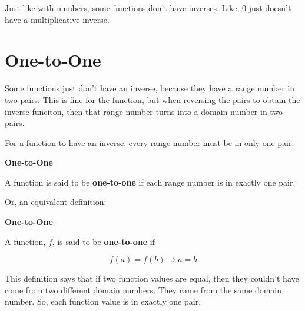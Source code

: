\documentclass{ximera}
\begin{document}
Just like with numbers, some functions don't have inverses.  Like, $0$ just doesn't have a multiplicative inverse.






\section{One-to-One}


Some functions just don't have an inverse, because they have a range number in two pairs.  This is fine for the function, but when reversing the pairs to obtain the inverse funciton, then that range number turns into a domain number in two pairs.


For a function to have an inverse, every range number must be in only one pair.



\begin{definition} \textbf{\textcolor{green!50!black}{One-to-One}}    


A function is said to be \textbf{one-to-one} if each range number is in exactly one pair.


\end{definition}



Or, an equivalent definition:

\begin{definition} \textbf{\textcolor{green!50!black}{One-to-One}}   


A function, $f$, is said to be \textbf{one-to-one} if 


\[    f(a) = f(b) \rightarrow a = b           \]


\end{definition}





This definition says that if two function values are equal, then they couldn't have come from two different domain numbers.  They came from the same domain number. So, each function value is in exactly one pair.
\end{document}
